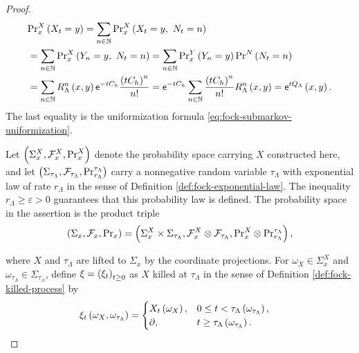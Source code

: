 \documentclass[11pt,a4paper]{article}
\theoremstyle{plain}
\theoremstyle{definition}
\theoremstyle{remark}
\begin{document}
\begin{proof}
$$\begin{aligned}
&\fun{\msrprb_x^{X}}{X_t=y}
=
\sum_{n\in\monnat}
\fun{\msrprb_x^{X}}{X_t=y,\ N_t=n}
\\
& =
\sum_{n\in\monnat}
\fun{\msrprb_x^{X}}{Y_n=y,\ N_t=n}
=
\sum_{n\in\monnat}
\fun{\msrprb_x^{Y}}{Y_n=y}
\fun{\msrprb^{N}}{N_t=n}
\\
& =
\sum_{n\in\monnat}
\fun{R_{\Lambda}^{n}}{x,y}
\napiernum^{-tC_h}
\frac{\rbk{tC_h}^{n}}{n!}
=
\fun{
\napiernum^{-tC_h}
\sum_{n\in\monnat}
\frac{\rbk{tC_h}^{n}}{n!}R_{\Lambda}^{n}
}{x,y}
=
\fun{\napiernum^{tQ_{\Lambda}}}{x,y}.
\end{aligned}$$
The last equality is the uniformization formula
\eqref{eq:fock-submarkov-uniformization}.

\begin{samepage}
Let $\left( \Sigma_x^{X},\mathcal{F}_x^{X},\mathrm{Pr}_x^{X} \right)$ denote the probability space carrying $X$ constructed
here, and let
$\left( \Sigma_{\tau_{\Lambda}},\mathcal{F}_{\tau_{\Lambda}},
\mathrm{Pr}_{r_{\Lambda}}^{\tau_{\Lambda}} \right)$ carry a nonnegative random variable
$\tau_{\Lambda}$ with exponential law of rate $r_{\Lambda}$ in the sense of
Definition \ref{def:fock-exponential-law}.
The inequality $r_{\Lambda}\geq\varepsilon>0$ guarantees that this probability law is defined.
The probability space in the assertion is the product triple
$$\begin{aligned}
\left( \Sigma_x,
\mathcal{F}_x,
\mathrm{Pr}_x \right)
=
\left( \Sigma_x^{X}\times\Sigma_{\tau_{\Lambda}},
\mathcal{F}_x^{X}\otimes\mathcal{F}_{\tau_{\Lambda}},
\mathrm{Pr}_x^{X}\otimes\mathrm{Pr}_{r_{\Lambda}}^{\tau_{\Lambda}} \right),
\end{aligned}$$
\end{samepage}
where $X$ and $\tau_{\Lambda}$ are lifted to $\Sigma_x$ by the coordinate projections.
For $\omega_X\in\Sigma_x^{X}$ and
$\omega_{\tau_{\Lambda}}\in\Sigma_{\tau_{\Lambda}}$, define $\xi = \left( \xi_t \right)_{t \geq 0}$ as $X$ killed at $\tau_{\Lambda}$ in the sense
of Definition \ref{def:fock-killed-process} by
\begin{equation}
\begin{aligned}
\fun{\xi_t}{\omega_X,\omega_{\tau_{\Lambda}}}
& =
\begin{cases}
\fun{X_t}{\omega_X},
&
0\leq t<\fun{\tau_{\Lambda}}{\omega_{\tau_{\Lambda}}},
\\
\partial,
&
t\geq\fun{\tau_{\Lambda}}{\omega_{\tau_{\Lambda}}}.
\end{cases}
\end{aligned}
\label{eq:fock-killed-process-definition}

\end{equation}
\end{proof}
\end{document}
